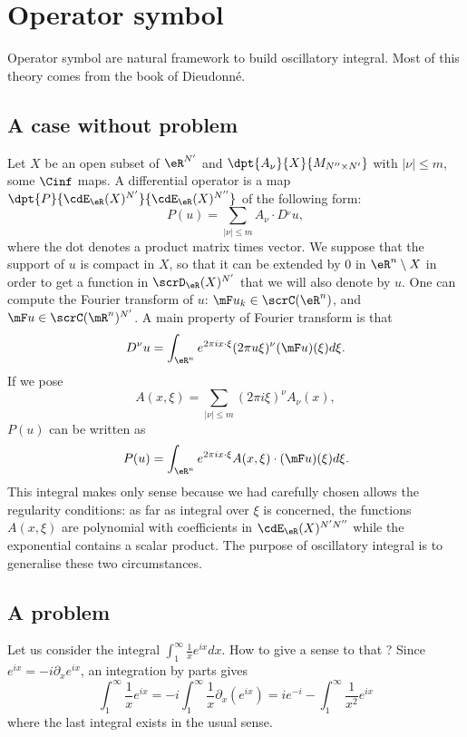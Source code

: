 

\section{Operator symbol}

Operator symbol are natural framework to build oscillatory integral. Most of this theory comes from the book \cite{Dieu7} of Dieudonné. 

\subsection{A case without problem}
Let $X$ be an open subset of $\eR^{N'}$ and $\dpt{A_{\nu}}{X}{M_{N''\times N'}}$ with $|\nu|\leq m$, some $\Cinf$ maps. A differential operator is a map $\dpt{P}{\cdE_{\eR}(X)^{N'}}{\cdE_{\eR}(X)^{N''}}$ of the following form: 
\[
  P(u)=\sum_{|\nu|\leq m}A_{\nu}\cdot D^{_{\nu}}u,
\]
where the dot denotes a product matrix times vector. We suppose that the support of $u$ is 
compact in $X$, so that it can be extended by $0$ in $\eR^n\setminus X$ in order to get a function in $\scrD_{\eR}(X)^{N'}$ that we will also denote by $u$. One can compute the Fourier transform of $u$: $\mF u_k\in\scrC(\eR^n)$, and $\mF u\in\scrC(\mR^n)^{N'}$. A main property of Fourier transform is that
\[
   D^{\nu}u=\int_{\eR^n} e^{2\pi ix\cdot\xi}(2\pi u\xi)^{\nu}(\mF u)(\xi)d\xi.
\]
If we pose 
\[
  A(x,\xi)=\sum_{|\nu|\leq m}(2\pi i\xi)^{\nu}A_{\nu}(x),
\]
$P(u)$ can be written as
\[ 
    P(u)=\int_{\eR^n} e^{2\pi ix\cdot\xi}A(x,\xi)\cdot(\mF u)(\xi)d\xi.
\]
This integral makes only sense because we had carefully chosen allows the regularity conditions: as far as integral over $\xi$ is concerned, the functions $A(x,\xi)$ are polynomial with coefficients in $\cdE_{\eR}(X)^{N'N''}$ while the exponential contains a scalar product. The purpose of oscillatory integral is to generalise these two circumstances.

\subsection{A problem}

Let us consider the integral $\int_1^{\infty}\frac{1}{x}e^{ix}dx$. How to give a sense to that ? Since $e^{ix}=-i\partial_xe^{ix}$, an integration by parts gives
\begin{equation}
 \int_1^{\infty}\frac{1}{x}e^{ix}=-i\int_1^{\infty}\frac{1}{x}\partial_x(e^{ix})
          =ie^{-i}-\int_1^{\infty}\frac{1}{x^2}e^{ix}
\end{equation}
where the last integral exists in the usual sense.

